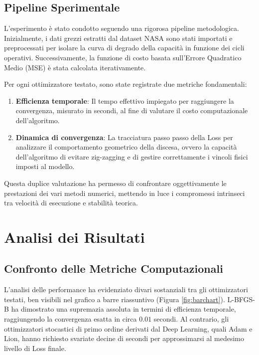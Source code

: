 \documentclass[11pt, a4paper]{article}
\begin{document}
\subsection{Pipeline Sperimentale}
L'esperimento è stato condotto seguendo una rigorosa pipeline metodologica. Inizialmente, i dati grezzi estratti dal dataset NASA sono stati importati e preprocessati per isolare la curva di degrado della capacità in funzione dei cicli operativi. Successivamente, la funzione di costo basata sull'Errore Quadratico Medio (MSE) è stata calcolata iterativamente.

Per ogni ottimizzatore testato, sono state registrate due metriche fondamentali:
\begin{enumerate}
    \item \textbf{Efficienza temporale}: Il tempo effettivo impiegato per raggiungere la convergenza, misurato in secondi, al fine di valutare il costo computazionale dell'algoritmo.
    \item \textbf{Dinamica di convergenza}: La tracciatura passo passo della Loss per analizzare il comportamento geometrico della discesa, ovvero la capacità dell'algoritmo di evitare zig-zagging e di gestire correttamente i vincoli fisici imposti al modello.
\end{enumerate}
Questa duplice valutazione ha permesso di confrontare oggettivamente le prestazioni dei vari metodi numerici, mettendo in luce i compromessi intrinseci tra velocità di esecuzione e stabilità teorica.




\section{Analisi dei Risultati}

\subsection{Confronto delle Metriche Computazionali}
L'analisi delle performance ha evidenziato divari sostanziali tra gli ottimizzatori testati, ben visibili nel grafico a barre riassuntivo (Figura \ref{fig:barchart}). 
L-BFGS-B ha dimostrato una supremazia assoluta in termini di efficienza temporale, raggiungendo la convergenza esatta in circa $0.01$ secondi. Al contrario, gli ottimizzatori stocastici di primo ordine derivati dal Deep Learning, quali Adam e Lion, hanno richiesto svariate decine di secondi per approssimarsi al medesimo livello di Loss finale.
\end{document}
